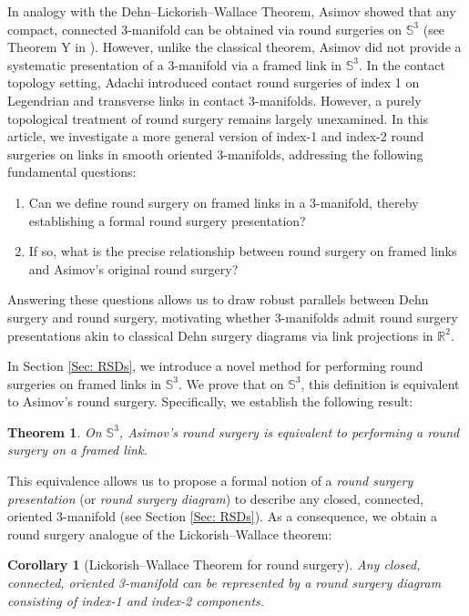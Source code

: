 \documentclass{amsart}
\theoremstyle{plain}
\newtheorem{thm}{Theorem}
\newtheorem{cor}{Corollary}
\theoremstyle{remark}
\theoremstyle{definition}
\begin{document}
In analogy with the Dehn--Lickorish--Wallace Theorem, Asimov showed that any compact, connected 3-manifold can be obtained via round surgeries on $\mathbb{S}^3$ (see Theorem Y in \cite{Asimov}). However, unlike the classical theorem, Asimov did not provide a systematic presentation of a 3-manifold via a framed link in $\mathbb{S}^3$. In the contact topology setting, Adachi \cite{Jiro, Jiro19} introduced contact round surgeries of index 1 on Legendrian and transverse links in contact 3-manifolds. However, a purely topological treatment of round surgery remains largely unexamined. In this article, we investigate a more general version of index-1 and index-2 round surgeries on links in smooth oriented 3-manifolds, addressing the following fundamental questions:

\begin{enumerate}
    \item Can we define round surgery on framed links in a 3-manifold, thereby establishing a formal round surgery presentation?
    \item If so, what is the precise relationship between round surgery on framed links and Asimov's original round surgery?
\end{enumerate}

Answering these questions allows us to draw robust parallels between Dehn surgery and round surgery, motivating whether 3-manifolds admit round surgery presentations akin to classical Dehn surgery diagrams via link projections in $\mathbb{R}^2$.

In Section \ref{Sec: RSDs}, we introduce a novel method for performing round surgeries on framed links in $\mathbb{S}^3$. We prove that on $\mathbb{S}^3$, this definition is equivalent to Asimov's round surgery. Specifically, we establish the following result:

\begin{thm}\label{thm: ARSequalsRS}
On $\mathbb{S}^3$, Asimov's round surgery is equivalent to performing a round surgery on a framed link.
\end{thm}

This equivalence allows us to propose a formal notion of a \emph{round surgery presentation} (or \emph{round surgery diagram}) to describe any closed, connected, oriented 3-manifold (see Section \ref{Sec: RSDs}). As a consequence, we obtain a round surgery analogue of the Lickorish--Wallace theorem:

\begin{cor}[Lickorish--Wallace Theorem for round surgery]\label{cor: AsimovResult}
Any closed, connected, oriented 3-manifold can be represented by a round surgery diagram consisting of index-1 and index-2 components.
\end{cor}
\end{document}
